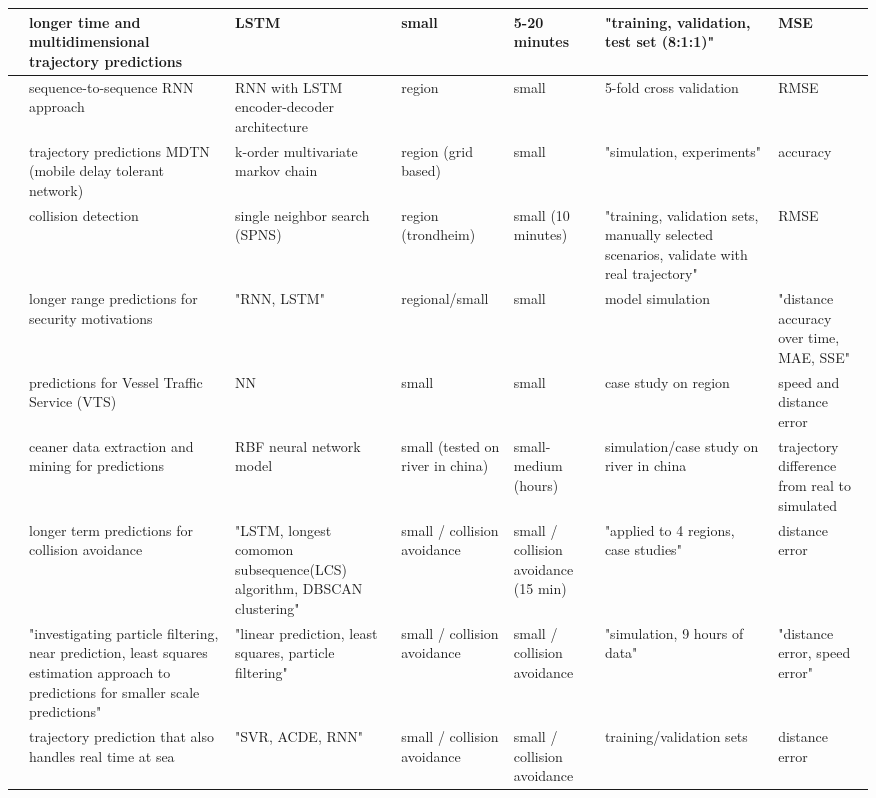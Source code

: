 \begin{sidewaystable}
{\begin{tabular}{|l|l|l|l|l|l|l|}
        \cite{DIng2020ALSTM} & longer time and multidimensional trajectory predictions & LSTM & small & 5-20 minutes & "training, validation, test set (8:1:1)" & MSE \\ \hline
        \cite{Forti2020PredictionNetworks} & sequence-to-sequence RNN approach & RNN with LSTM encoder-decoder architecture & region & small & 5-fold cross validation & RMSE \\ \hline
        \cite{Guo2018TrajectoryChain} & trajectory predictions MDTN (mobile delay tolerant network) & k-order multivariate markov chain & region (grid based) & small & "simulation, experiments" & accuracy \\ \hline
        \cite{Hexeberg2017AIS-basedPrediction} & collision detection & single neighbor search (SPNS) & region (trondheim) & small (10 minutes) & "training, validation sets, manually selected scenarios, validate with real trajectory" & RMSE \\ \hline
        \cite{Jin2020MaritimeNetwork} & longer range predictions for security motivations & "RNN, LSTM" & regional/small & small & model simulation & "distance accuracy over time, MAE, SSE" \\ \hline
        \cite{Kim2018PreprocessingArea} & predictions for Vessel Traffic Service (VTS) & NN & small & small & case study on region & speed and distance error \\ \hline
        \cite{Li2018ShipMining} & ceaner data extraction and mining for predictions & RBF neural network model & small (tested on river in china) & small-medium (hours) & simulation/case study on river in china & trajectory difference from real to simulated \\ \hline
        \cite{Li2019Long-termData} & longer term predictions for collision avoidance & "LSTM, longest comomon subsequence(LCS) algorithm, DBSCAN clustering" & small / collision avoidance & small / collision avoidance (15 min) & "applied to 4 regions, case studies" & distance error \\ \hline
        \cite{Lian2019ResearchAlgorithm} & "investigating particle filtering, near prediction, least squares estimation approach to predictions for smaller scale predictions" & "linear prediction, least squares, particle filtering" & small / collision avoidance & small / collision avoidance & "simulation, 9 hours of data" & "distance error, speed error" \\ \hline
        \cite{Liu2019VesselACDE-SVR} & trajectory prediction that also handles real time at sea & "SVR, ACDE, RNN" & small / collision avoidance & small / collision avoidance & training/validation sets & distance error \\ \hline

\end{tabular}}
\end{sidewaystable}
